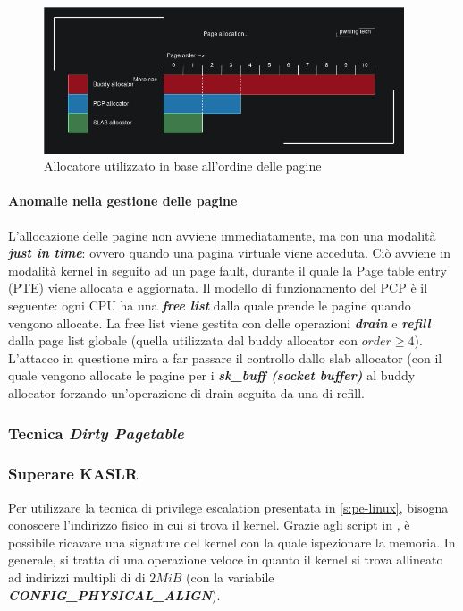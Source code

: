 \documentclass{article}
\begin{document}
\begin{figure}[h]
  \begin{center}
    \includegraphics[width=0.95\textwidth]{figures/ch1/allocator-per-order.png}
  \end{center}
  \caption{Allocatore utilizzato in base all'ordine delle pagine}\label{fig:allocator-per-order}
\end{figure}

\paragraph{Anomalie nella gestione delle pagine} L'allocazione delle pagine non avviene 
immediatamente, ma con una modalità \textbf{\textit{just in time}}: ovvero quando una pagina 
virtuale viene acceduta. Ciò avviene in modalità kernel in seguito ad un page fault, durante 
il quale la Page table entry (PTE) viene allocata e aggiornata. Il modello di funzionamento del 
PCP è il seguente: ogni CPU ha una \textbf{\textit{free list}} dalla quale prende le pagine 
quando vengono allocate. La free list viene gestita con delle operazioni \textbf{\textit{drain}} e 
\textbf{\textit{refill}} dalla page list globale (quella utilizzata dal buddy allocator con 
$order \geq 4$). L'attacco in questione mira a far passare il controllo dallo slab allocator
(con il quale vengono allocate le pagine per i \textbf{\textit{sk\_buff (socket buffer)}} al 
buddy allocator forzando un'operazione di drain seguita da una di refill.

\clearpage


\subsubsection{Tecnica \textit{Dirty Pagetable}}

\subsubsection{Superare KASLR}
Per utilizzare la tecnica di privilege escalation presentata in \cref{s:pe-linux}, 
bisogna conoscere l'indirizzo fisico in cui si trova il kernel. Grazie agli script in 
\cite{KernelSig}, è possibile ricavare una signature del kernel con la quale ispezionare 
la memoria. In generale, si tratta di una operazione veloce in quanto il kernel si trova 
allineato ad indirizzi multipli di di $2MiB$ (con la variabile \textbf{\textit{CONFIG\_PHYSICAL\_ALIGN}}). 
\end{document}
